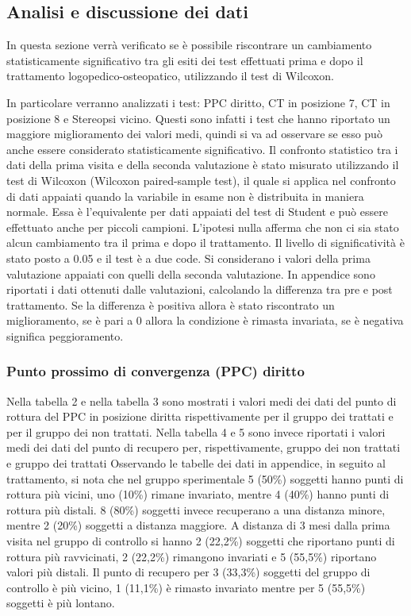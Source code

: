  
 
\subsection{Analisi e discussione dei dati}
 
In questa sezione verrà verificato se è possibile riscontrare un cambiamento statisticamente significativo tra gli esiti dei test effettuati prima e dopo il trattamento logopedico-osteopatico, utilizzando il test di Wilcoxon.
 
In particolare verranno analizzati i test: PPC diritto, CT in posizione 7, CT in posizione 8 e Stereopsi vicino. Questi sono infatti i test che hanno riportato un maggiore miglioramento dei valori medi, quindi si va ad osservare se esso può anche essere considerato statisticamente significativo. Il confronto statistico tra i dati della prima visita e della seconda valutazione è stato misurato utilizzando il test di Wilcoxon (Wilcoxon paired-sample test), il quale si applica nel confronto di dati appaiati quando la variabile in esame non è distribuita in maniera normale. Essa è l’equivalente per dati appaiati del test di Student e può essere effettuato anche per piccoli campioni. L’ipotesi nulla afferma che non ci sia stato alcun cambiamento tra il prima e dopo il trattamento. Il livello di significatività è stato posto a 0.05 e il test è a due code. Si considerano i valori della prima valutazione appaiati con quelli della seconda valutazione. In appendice sono riportati i dati ottenuti dalle valutazioni, calcolando la differenza tra pre e post trattamento. Se la differenza è positiva allora è stato riscontrato un miglioramento, se è pari a 0 allora la condizione è rimasta invariata, se è negativa significa peggioramento.
 
 
 
\subsubsection{Punto prossimo di convergenza (PPC) diritto}

Nella tabella 2 e nella tabella 3 sono mostrati i valori medi dei dati del punto di rottura del PPC in posizione diritta rispettivamente per il gruppo dei trattati e per il gruppo dei non trattati. Nella tabella 4 e 5 sono invece riportati i valori medi dei dati del punto di recupero per, rispettivamente, gruppo dei non trattati e gruppo dei trattati Osservando le tabelle dei dati in appendice, in seguito al trattamento, si nota che nel gruppo sperimentale 5 (50\%) soggetti hanno punti di rottura più vicini, uno (10\%) rimane invariato, mentre 4 (40\%) hanno punti di rottura più distali. 8 (80\%) soggetti invece recuperano a una distanza minore, mentre 2 (20\%) soggetti a distanza maggiore. A distanza di 3 mesi dalla prima visita nel gruppo di controllo si hanno 2 (22,2\%) soggetti che riportano punti di rottura più ravvicinati, 2 (22,2\%) rimangono invariati e 5 (55,5\%) riportano valori più distali. Il punto di recupero per 3 (33,3\%) soggetti del gruppo di controllo è più vicino, 1 (11,1\%) è rimasto invariato mentre per 5 (55,5\%) soggetti è più lontano. 

